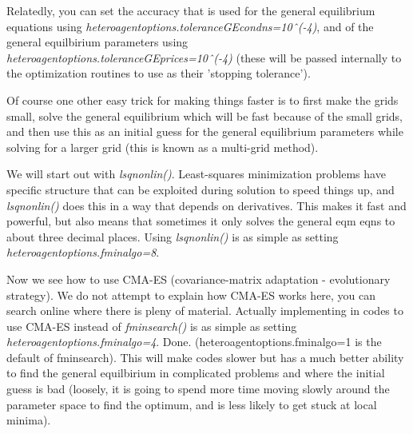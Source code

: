 Relatedly, you can set the accuracy that is used for the general equilibrium equations using \textit{heteroagentoptions.toleranceGEcondns=10ˆ(-4)}, and of the general equilbirium parameters using \textit{heteroagentoptions.toleranceGEprices=10ˆ(-4)} (these will be passed internally to the optimization routines to use as their 'stopping tolerance').

Of course one other easy trick for making things faster is to first make the grids small, solve the general equilibrium which will be fast because of the small grids, and then use this as an initial guess for the general equilibrium parameters while solving for a larger grid (this is known as a multi-grid method).

We will start out with \textit{lsqnonlin()}. Least-squares minimization problems have specific structure that can be exploited during solution to speed things up, and \textit{lsqnonlin()} does this in a way that depends on derivatives. This makes it fast and powerful, but also means that sometimes it only solves the general eqm eqns to about three decimal places. Using \textit{lsqnonlin()} is as simple as setting \textit{heteroagentoptions.fminalgo=8}.

Now we see how to use CMA-ES (covariance-matrix adaptation - evolutionary strategy). We do not attempt to explain how CMA-ES works here, you can search online where there is pleny of material. Actually implementing in codes to use CMA-ES instead of \textit{fminsearch()} is as simple as setting \textit{heteroagentoptions.fminalgo=4}. Done. (heteroagentoptions.fminalgo=1 is the default of fminsearch). This will make codes slower but has a much better ability to find the general equilbirium in complicated problems and where the initial guess is bad (loosely, it is going to spend more time moving slowly around the parameter space to find the optimum, and is less likely to get stuck at local minima).

